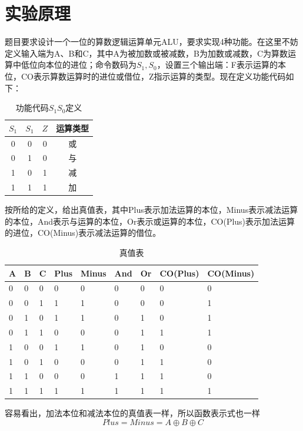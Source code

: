 \documentclass{ctexart}
\begin{document}
\section{实验原理}
题目要求设计一个一位的算数逻辑运算单元ALU，要求实现4种功能。在这里不妨定义输入端为A、B和C，其中A为被加数或被减数，B为加数或减数，C为算数运算中低位向本位的进位；命令数码为$S_1,S_0$，设置三个输出端：F表示运算的本位，CO表示算数运算时的进位或借位，Z指示运算的类型。现在定义功能代码如下：
\begin{table}[H]
    \centering
    \caption{功能代码$S_1S_0$定义}
    \begin{tabular}{cccc}
    \hline 
        $S_1$ & $S_1$ & $Z$ & 运算类型\\ \hline 
        0 & 0 & 0 & 或\\
        0 & 1 & 0 & 与\\
        1 & 0 & 1 & 减\\
        1 & 1 & 1 & 加\\ \hline 
    \end{tabular}
    \label{tab:功能代码$S_1S_0$定义}
\end{table}
按所给的定义，给出真值表，其中Plus表示加法运算的本位，Minus表示减法运算的本位，And表示与运算的本位，Or表示或运算的本位，CO(Plus)表示加法运算的进位，CO(Minus)表示减法运算的借位。
\begin{longtable}{|p{1cm}<{\centering}| p{1cm}<{\centering} |p{1cm}<{\centering}| p{1cm}<{\centering} |p{1cm}<{\centering}|p{1cm}<{\centering}|p{1cm}<{\centering}|p{2cm}<{\centering}|p{2cm}<{\centering}|}%
\caption{真值表}
\hline 
  A & B & C & Plus & Minus & And & Or & CO(Plus) & CO(Minus) \\ \hline
  0 & 0 & 0 & 0 & 0 & 0 & 0 & 0 & 0\\
\hline
  0 & 0 & 1 & 1 & 1 & 0 & 0 & 0 & 1 \\
\hline
  0 & 1 & 0 & 1 & 1 & 0 & 1 & 0 & 1 \\
\hline
  0 & 1 & 1 & 0 & 0 & 0 & 1 & 1 & 1 \\
\hline
  1 & 0 & 0 & 1 & 1 & 0 & 1 & 0 & 0 \\
\hline
  1 & 0 & 1 & 0 & 0 & 0 & 1 & 1 & 0 \\
\hline
  1 & 1 & 0 & 0 & 0 & 1 & 1 & 1 & 0 \\
\hline
  1 & 1 & 1 & 1 & 1 & 1 & 1 & 1 & 1 \\
\hline

\end{longtable}
容易看出，加法本位和减法本位的真值表一样，所以函数表示式也一样
\begin{equation}
    Plus=Minus=A\oplus B \oplus C
\end{equation}
\end{document}
